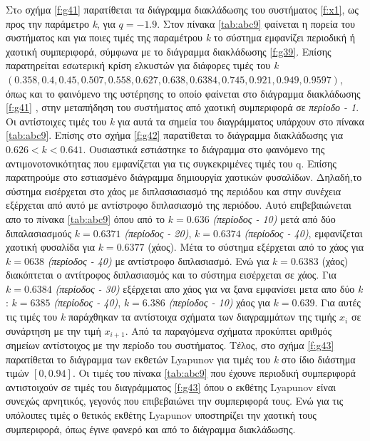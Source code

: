Στo σχήμα \ref{f:g41} παρατίθεται τα διάγραμμα διακλάδωσης του συστήματος \ref{f:x1}, ως προς την παράμετρο \emph{k}, για $q =- 1.9$. Στον πίνακα \ref{tab:abc9} φαίνεται η πορεία του συστήματος και για ποιες τιμές της παραμέτρου \emph{k} το σύστημα εμφανίζει περιοδική ή χαοτική συμπεριφορά, σύμφωνα με το διάγραμμα διακλάδωσης \ref{f:g39}. Επίσης παρατηρείται εσωτερική κρίση ελκυστών για διάφορες τιμές του \emph{k} $(0.358, 0.4, 0.45, 0.507, 0.558, 0.627, 0.638, 0.6384, 0.745, 0.921, 0.949, 0.9597)$, όπως και το φαινόμενο της υστέρησης το οποίο φαίνεται στο διάγραμμα διακλάδωσης \ref{f:g41} , στην μεταπήδηση του συστήματος από χαοτική συμπεριφορά σε \emph{περίοδο - 1}. Οι αντίστοιχες τιμές του \emph{k} για αυτά τα σημεία του διαγράμματος υπάρχουν στο πίνακα \ref{tab:abc9}.
Επίσης στο σχήμα \ref{f:g42} παρατίθεται το διάγραμμα διακλάδωσης για $0.626<k<0.641$. Ουσιαστικά εστιάστηκε το διάγραμμα στο φαινόμενο της αντιμονοτονικότητας που εμφανίζεται για τις συγκεκριμένες τιμές του q. Επίσης παρατηρούμε στο εστιασμένο διάγραμμα  δημιουργία χαοτικών φυσαλίδων. Δηλαδή,το σύστημα εισέρχεται στο χάος με διπλασιασιασμό της περιόδου και στην συνέχεια εξέρχεται από αυτό με αντίστροφο διπλασιασμό της περιόδου. Αυτό επιβεβαιώνεται απο το πίνακα \ref{tab:abc9} όπου από το $k=0.636$ \emph{(περίοδος -   10)} μετά από δύο διπαλασιασμούς $k=0.6371$ \emph{(περίοδος -   20)}, $k=0.6374$ \emph{(περίοδος -   40)}, εμφανίζεται χαοτική φυσαλίδα για $k=0.6377$ (χάος). Μέτα το σύστημα εξέρχεται από το χάος για $k=0638$ \emph{(περίοδος -   40)} με αντίστροφο διπλασιασμό. Ενώ για $k=0.6383$ (χάος) διακόπτεται ο αντίτροφος διπλασιασμός και το σύστημα εισέρχεται σε χάος. Για $k=0.6384$ \emph{(περίοδος -   30)} εξέρχεται απο χάος για να ξανα εμφανίσει μετα απο δύο \emph{k} : $k=6385$ \emph{(περίοδος -   40)}, $k=6.386$ \emph{(περίοδος -   10)} χάος για $k=0.639$. Για αυτές τις τιμές του \emph{k} παράχθηκαν τα αντίστοιχα σχήματα των διαγραμμάτων της τιμής \(x_i\) σε συνάρτηση με την τιμή \(x_{i+1}\). Από τα παραγόμενα σχήματα προκύπτει αριθμός σημείων αντίστοιχος με την περίοδο του συστήματος.
Τέλος, στο σχήμα \ref{f:g43} παρατίθεται το διάγραμμα των εκθετών Lyapunov για τιμές του \emph{k} στο ίδιο διάστημα τιμών $[0, 0.94]$. Οι τιμές του πίνακα \ref{tab:abc9} που έχουνε περιοδική συμπεριφορά αντιστοιχούν σε τιμές του διαγράμματος \ref{f:g43} όπου ο εκθέτης Lyapunov είναι συνεχώς αρνητικός, γεγονός που επιβεβαιώνει την συμπεριφορά τους. Ενώ για τις υπόλοιπες τιμές ο θετικός εκθέτης Lyapunov υποστηρίζει την χαοτική τους συμπεριφορά, όπως έγινε φανερό και από το διάγραμμα διακλάδωσης.


